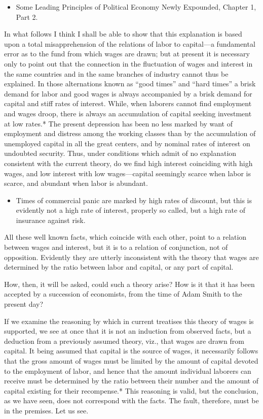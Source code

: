 \begin{itemize}
\tightlist
\item
  Some Leading Principles of Political Economy Newly Expounded, Chapter
  1, Part 2.
\end{itemize}

In what follows I think I shall be able to show that this explanation is
based upon a total misapprehension of the relations of labor to
capital---a fundamental error as to the fund from which wages are drawn;
but at present it is necessary only to point out that the connection in
the fluctuation of wages and interest in the same countries and in the
same branches of industry cannot thus be explained. In those
alternations known as ``good times'' and ``hard times'' a brisk demand
for labor and good wages is always accompanied by a brisk demand for
capital and stiff rates of interest. While, when laborers cannot find
employment and wages droop, there is always an accumulation of capital
seeking investment at low rates.* The present depression has been no
less marked by want of employment and distress among the working classes
than by the accumulation of unemployed capital in all the great centers,
and by nominal rates of interest on undoubted security. Thus, under
conditions which admit of no explanation consistent with the current
theory, do we find high interest coinciding with high wages, and low
interest with low wages---capital seemingly scarce when labor is scarce,
and abundant when labor is abundant.

\begin{itemize}
\tightlist
\item
  Times of commercial panic are marked by high rates of discount, but
  this is evidently not a high rate of interest, properly so called, but
  a high rate of insurance against risk.
\end{itemize}

All these well known facts, which coincide with each other, point to a
relation between wages and interest, but it is to a relation of
conjunction, not of opposition. Evidently they are utterly inconsistent
with the theory that wages are determined by the ratio between labor and
capital, or any part of capital.

How, then, it will be asked, could such a theory arise? How is it that
it has been accepted by a succession of economists, from the time of
Adam Smith to the present day?

If we examine the reasoning by which in current treatises this theory of
wages is supported, we see at once that it is not an induction from
observed facts, but a deduction from a previously assumed theory, viz.,
that wages are drawn from capital. It being assumed that capital is the
source of wages, it necessarily follows that the gross amount of wages
must be limited by the amount of capital devoted to the employment of
labor, and hence that the amount individual laborers can receive must be
determined by the ratio between their number and the amount of capital
existing for their recompense.* This reasoning is valid, but the
conclusion, as we have seen, does not correspond with the facts. The
fault, therefore, must be in the premises. Let us see.

